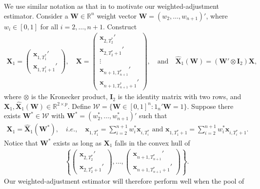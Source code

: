 \documentclass[11pt]{article}
\newcommand{\R}{\mathbb{R}}
\def\mbf#1{\mathbf{#1}} %
\def\mc#1{\mathcal{#1}} %
\theoremstyle{definition}
\begin{document}
We use similar notation as that in \cite{abadie2010synthetic} to motivate our weighted-adjustment estimator. Consider a $\mbf{W} \in \R^n$ weight vector 
$\mbf{W}=(w_2, \ldots, w_{n+1})'$, where $w_i\in [0,1]$ for all 
$i = 2, \ldots, n+1$. Construct
\begin{align*}
 \mbf{X}_1 = \begin{pmatrix}
    \mbf{x}_{1, T_1^*}' \\ \mbf{x}_{1, T_1^*+1}'
  \end{pmatrix},
  \quad  
  \mbf{X} = \begin{pmatrix}
  	\mbf{x}_{2, T_2^*}' \\
    \mbf{x}_{2, T_2^*+1}' \\
    \vdots \\
  	\mbf{x}_{n+1, T_{n+1}^*}' \\
    \mbf{x}_{n+1, T_{n+1}^*+1}'
  \end{pmatrix},
  \quad \text{and} \quad 
  \hat{\mbf{X}}_1(\mbf{W}) 
    = (\mbf{W}' \otimes \mbf{I}_2) \mbf{X},
\end{align*}
where $\otimes$ is the Kronecker product, $\mbf{I}_2$ is the identity matrix with two rows, and $\mbf{X}_1,\hat{\mbf{X}}_1(\mbf{W}) \in \R^{2 \times p}$. Define $\mc{W}=\{\mbf{W}\in [0,1]^n \colon 1_n'\mbf{W} = 1 \}$. 
Suppose there exists $\mbf{W}^*\in \mc{W}$ with 
$\mbf{W}^*=(w_2^*, \ldots, w_{n+1}^*)'$ such that
\begin{align}
 \mbf{X}_1=\hat{\mbf{X}}_1(\mbf{W}^*),  \quad i.e., \quad \mbf{x}_{1, T_1^*} = \sum_{i=2}^{n+1} w_i^*\mbf{x}_{i, T_i^*} \text{ and } \mbf{x}_{1, T_1^*+1} = \sum_{i=2}^{n+1} w_i^*\mbf{x}_{i, T_i^*+1}.\label{SCM}
\end{align}
 Notice that $\mbf{W}^*$ exists as long as $\mbf{X}_1$ falls in the convex hull of 
 \begin{align*}
   \left\{ \begin{pmatrix}
     \mbf{x}_{2, T_2^*}' \\
      \mbf{x}_{2, T_2^*+1}'
   \end{pmatrix}, \ldots, \begin{pmatrix}
     \mbf{x}_{n+1, T_{n+1}^*}' \\
      \mbf{x}_{n+1, T_{n+1}^*+1}'
   \end{pmatrix} \right\}.
 \end{align*}
Our weighted-adjustment estimator will therefore perform well when the pool of 
\end{document}
